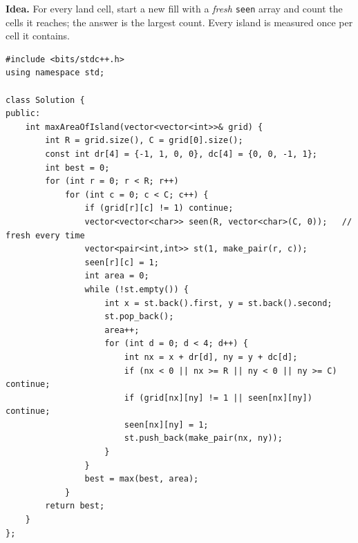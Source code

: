 \begin{bruteforcebox}
\textbf{Idea.} For every land cell, start a new fill with a \emph{fresh} \texttt{seen} array and count the cells it reaches; the answer is the largest count. Every island is measured once per cell it contains.

\begin{lstlisting}[style=cpp]
#include <bits/stdc++.h>
using namespace std;

class Solution {
public:
    int maxAreaOfIsland(vector<vector<int>>& grid) {
        int R = grid.size(), C = grid[0].size();
        const int dr[4] = {-1, 1, 0, 0}, dc[4] = {0, 0, -1, 1};
        int best = 0;
        for (int r = 0; r < R; r++)
            for (int c = 0; c < C; c++) {
                if (grid[r][c] != 1) continue;
                vector<vector<char>> seen(R, vector<char>(C, 0));   // fresh every time
                vector<pair<int,int>> st(1, make_pair(r, c));
                seen[r][c] = 1;
                int area = 0;
                while (!st.empty()) {
                    int x = st.back().first, y = st.back().second;
                    st.pop_back();
                    area++;
                    for (int d = 0; d < 4; d++) {
                        int nx = x + dr[d], ny = y + dc[d];
                        if (nx < 0 || nx >= R || ny < 0 || ny >= C) continue;
                        if (grid[nx][ny] != 1 || seen[nx][ny]) continue;
                        seen[nx][ny] = 1;
                        st.push_back(make_pair(nx, ny));
                    }
                }
                best = max(best, area);
            }
        return best;
    }
};
\end{lstlisting}

\begin{diagrambox}
\end{diagrambox}


\end{bruteforcebox}
